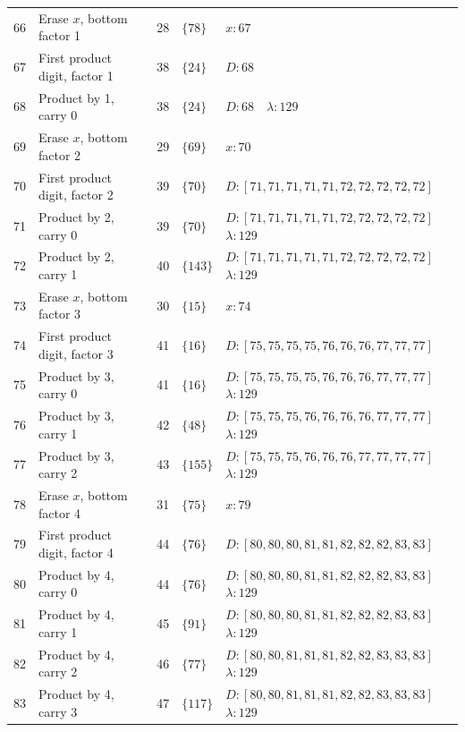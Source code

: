 \documentclass[11pt,a4paper]{article}
\newcommand{\blank}{\lambda}
\begin{document}
\begin{longtable}{r p{4.0cm} r l p{8.1cm}}
66 & Erase $x$, bottom factor 1 & 28 & $\{78\}$ & $x:67$ \\
67 & First product digit, factor 1 & 38 & $\{24\}$ & $D:68$ \\
68 & Product by 1, carry 0 & 38 & $\{24\}$ & $D:68\quad \blank:129$ \\
69 & Erase $x$, bottom factor 2 & 29 & $\{69\}$ & $x:70$ \\
70 & First product digit, factor 2 & 39 & $\{70\}$ & $D:[71,71,71,71,71,72,72,72,72,72]$ \\
71 & Product by 2, carry 0 & 39 & $\{70\}$ & $D:[71,71,71,71,71,72,72,72,72,72]$\newline$\blank:129$ \\
72 & Product by 2, carry 1 & 40 & $\{143\}$ & $D:[71,71,71,71,71,72,72,72,72,72]$\newline$\blank:129$ \\
73 & Erase $x$, bottom factor 3 & 30 & $\{15\}$ & $x:74$ \\
74 & First product digit, factor 3 & 41 & $\{16\}$ & $D:[75,75,75,75,76,76,76,77,77,77]$ \\
75 & Product by 3, carry 0 & 41 & $\{16\}$ & $D:[75,75,75,75,76,76,76,77,77,77]$\newline$\blank:129$ \\
76 & Product by 3, carry 1 & 42 & $\{48\}$ & $D:[75,75,75,76,76,76,76,77,77,77]$\newline$\blank:129$ \\
77 & Product by 3, carry 2 & 43 & $\{155\}$ & $D:[75,75,75,76,76,76,77,77,77,77]$\newline$\blank:129$ \\
78 & Erase $x$, bottom factor 4 & 31 & $\{75\}$ & $x:79$ \\
79 & First product digit, factor 4 & 44 & $\{76\}$ & $D:[80,80,80,81,81,82,82,82,83,83]$ \\
80 & Product by 4, carry 0 & 44 & $\{76\}$ & $D:[80,80,80,81,81,82,82,82,83,83]$\newline$\blank:129$ \\
81 & Product by 4, carry 1 & 45 & $\{91\}$ & $D:[80,80,80,81,81,82,82,82,83,83]$\newline$\blank:129$ \\
82 & Product by 4, carry 2 & 46 & $\{77\}$ & $D:[80,80,81,81,81,82,82,83,83,83]$\newline$\blank:129$ \\
83 & Product by 4, carry 3 & 47 & $\{117\}$ & $D:[80,80,81,81,81,82,82,83,83,83]$\newline$\blank:129$ \\

\end{longtable}
\end{document}
